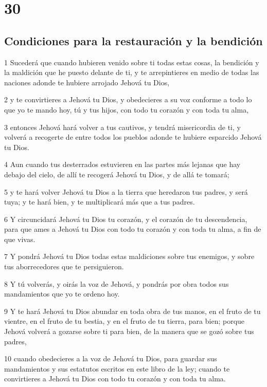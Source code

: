 \chapter{30}

\section{Condiciones para la restauración y la bendición}

\par 1 Sucederá que cuando hubieren venido sobre ti todas estas cosas, la bendición y la maldición que he puesto delante de ti, y te arrepintieres en medio de todas las naciones adonde te hubiere arrojado Jehová tu Dios,
\par 2 y te convirtieres a Jehová tu Dios, y obedecieres a su voz conforme a todo lo que yo te mando hoy, tú y tus hijos, con todo tu corazón y con toda tu alma,
\par 3 entonces Jehová hará volver a tus cautivos, y tendrá misericordia de ti, y volverá a recogerte de entre todos los pueblos adonde te hubiere esparcido Jehová tu Dios.
\par 4 Aun cuando tus desterrados estuvieren en las partes más lejanas que hay debajo del cielo, de allí te recogerá Jehová tu Dios, y de allá te tomará;
\par 5 y te hará volver Jehová tu Dios a la tierra que heredaron tus padres, y será tuya; y te hará bien, y te multiplicará más que a tus padres.
\par 6 Y circuncidará Jehová tu Dios tu corazón, y el corazón de tu descendencia, para que ames a Jehová tu Dios con todo tu corazón y con toda tu alma, a fin de que vivas.
\par 7 Y pondrá Jehová tu Dios todas estas maldiciones sobre tus enemigos, y sobre tus aborrecedores que te persiguieron.
\par 8 Y tú volverás, y oirás la voz de Jehová, y pondrás por obra todos sus mandamientos que yo te ordeno hoy.
\par 9 Y te hará Jehová tu Dios abundar en toda obra de tus manos, en el fruto de tu vientre, en el fruto de tu bestia, y en el fruto de tu tierra, para bien; porque Jehová volverá a gozarse sobre ti para bien, de la manera que se gozó sobre tus padres,
\par 10 cuando obedecieres a la voz de Jehová tu Dios, para guardar sus mandamientos y sus estatutos escritos en este libro de la ley; cuando te convirtieres a Jehová tu Dios con todo tu corazón y con toda tu alma.
